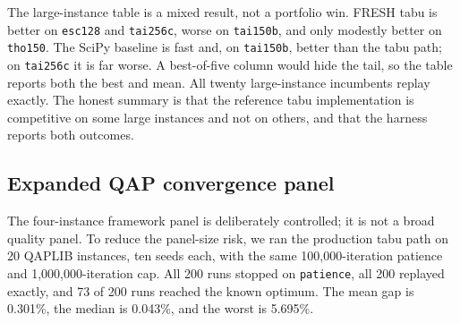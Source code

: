 \documentclass[11pt]{article}
\begin{document}
The large-instance table is a mixed result, not a portfolio win. FRESH tabu is better on
\texttt{esc128} and \texttt{tai256c}, worse on \texttt{tai150b}, and only modestly better on
\texttt{tho150}. The SciPy baseline is fast and, on \texttt{tai150b}, better than the tabu path; on
\texttt{tai256c} it is far worse. A best-of-five column would hide the tail, so the table reports both
the best and mean. All twenty large-instance incumbents replay exactly. The honest summary is that
the reference tabu implementation is competitive on some large instances and not on others, and that
the harness reports both outcomes.

\subsection{Expanded QAP convergence panel}

The four-instance framework panel is deliberately controlled; it is not a broad quality panel. To
reduce the panel-size risk, we ran the production tabu path on 20 QAPLIB instances, ten seeds each,
with the same 100,000-iteration patience and 1,000,000-iteration cap. All 200 runs stopped on
\texttt{patience}, all 200 replayed exactly, and 73 of 200 runs reached the known optimum. The mean
gap is 0.301\%, the median is 0.043\%, and the worst is 5.695\%.
\end{document}
